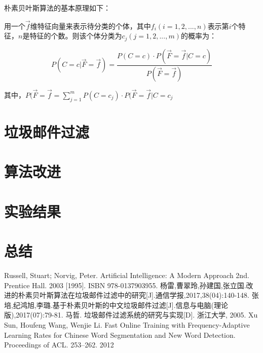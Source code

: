 \documentclass[UTF8,zihao=-4]{ctexart}
\begin{document}
	朴素贝叶斯算法的基本原理如下：
	
	用一个$\vec{f}$维特征向量来表示待分类的个体，其中$f_i(i=1,2,...,n)$表示第$i$个特征，$n$是特征的个数。则该个体分类为$c_j(j=1,2,...,m)$的概率为：
	
	$$P(C=c|\vec{F}=\vec{f})=\frac{P(C=c) \cdot P(\vec{F}=\vec{f}|C=c)} {P(\vec{F}=\vec{f})}$$
	
	其中，$P(\vec{F}=\vec{f}=\sum\limits_{j=1}^{m} P(C=c_j) \cdot P(\vec{F}=\vec{f}|C=c_j$
	

\section{垃圾邮件过滤}
\zhlipsum*[5]

\section{算法改进}
\zhlipsum*[6]

\section{实验结果}
\zhlipsum[7-9]

\section*{总结}
\zhlipsum[8-9]

\begin{thebibliography}{99}
  \linespread{1.25}\songti{}
  Russell, Stuart; Norvig, Peter. Artificial Intelligence: A Modern Approach 2nd. Prentice Hall. 2003 [1995]. ISBN 978-0137903955.
  杨雷,曹翠玲,孙建国,张立国.改进的朴素贝叶斯算法在垃圾邮件过滤中的研究[J].通信学报,2017,38(04):140-148.
  张培,纪鸿旭,李璐.基于朴素贝叶斯的中文垃圾邮件过滤[J].信息与电脑(理论版),2017(07):79-81.
  马哲. 垃圾邮件过滤系统的研究与实现[D]. 浙江大学, 2005.
  Xu Sun, Houfeng Wang, Wenjie Li. Fast Online Training with Frequency-Adaptive Learning Rates for Chinese Word Segmentation and New Word Detection. Proceedings of ACL. 253–262. 2012
\end{thebibliography}
\end{document}
